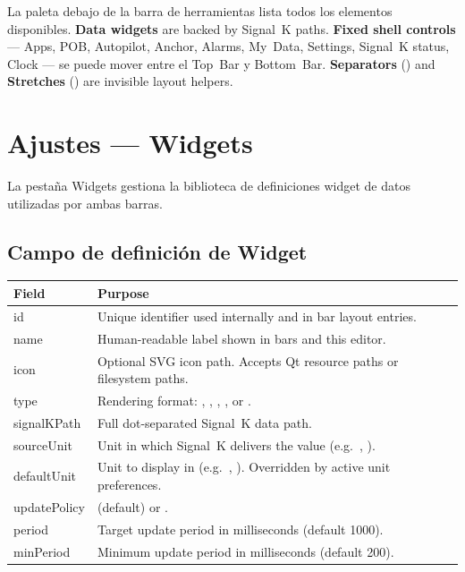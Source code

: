 La paleta debajo de la barra de herramientas lista todos los elementos disponibles.
\textbf{Data widgets} are backed by Signal~K paths.
\textbf{Fixed shell controls} --- Apps, POB, Autopilot, Anchor, Alarms, My~Data, Settings,
Signal~K status, Clock --- se puede mover entre el Top~Bar y Bottom~Bar.
\textbf{Separators} () and \textbf{Stretches}
() are invisible layout helpers.

\chapter{Ajustes --- Widgets}
\label{ch:settings-widgets}

La pestaña Widgets gestiona la biblioteca de definiciones widget de datos utilizadas por ambas barras.


\section{Campo de definición de Widget}

\begin{longtable}{L{2.8cm}L{10.9cm}}
\toprule
{}
\color{white}\sffamily\bfseries Field &
\color{white}\sffamily\bfseries Purpose \\
\midrule
id            & Unique identifier used internally and in bar layout entries. \\
name          & Human-readable label shown in bars and this editor. \\
icon          & Optional SVG icon path. Accepts Qt resource paths or filesystem paths. \\
type          & Rendering format: , , ,
                , or . \\
signalKPath   & Full dot-separated Signal~K data path. \\
sourceUnit    & Unit in which Signal~K delivers the value (e.g.\ , ). \\
defaultUnit   & Unit to display in (e.g.\ , ).
                Overridden by active unit preferences. \\
updatePolicy  &  (default) or . \\
period        & Target update period in milliseconds (default 1000). \\
minPeriod     & Minimum update period in milliseconds (default 200). \\
\bottomrule
\end{longtable}

